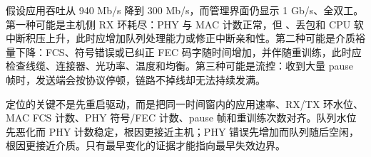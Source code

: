
假设应用吞吐从 940 Mb/s 降到 300 Mb/s，而管理界面仍显示 1 Gb/s、全双工。第一种可能是主机侧 RX 环耗尽：PHY 与 MAC 计数正常，但 、丢包和 CPU 软中断积压上升，此时应增加队列处理能力或修正中断亲和性。第二种可能是介质裕量下降：FCS、符号错误或已纠正 FEC 码字随时间增加，并伴随重训练，此时应检查线缆、连接器、光功率、温度和均衡。第三种可能是流控：收到大量 pause 帧时，发送端会按协议停顿，链路不掉线却无法持续发满。

定位的关键不是先重启驱动，而是把同一时间窗内的应用速率、RX/TX 环水位、MAC FCS 计数、PHY 符号/FEC 计数、pause 帧和重训练次数对齐。队列水位先恶化而 PHY 计数稳定，根因更接近主机；PHY 错误先增加而队列随后空闲，根因更接近介质。只有最早变化的证据才能指向最早失效边界。
